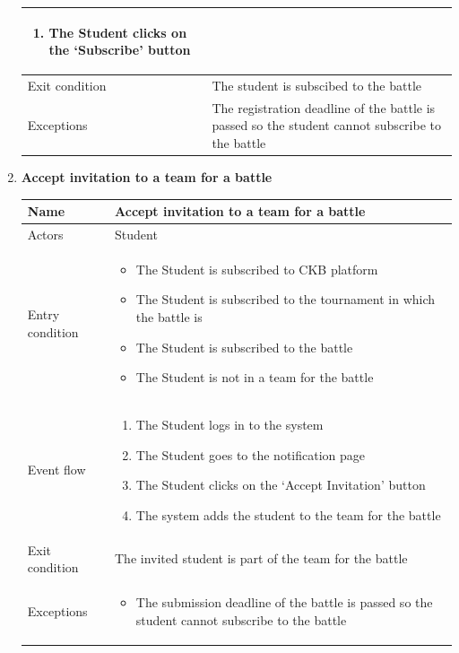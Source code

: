 \begin{enumerate}[label=UC\arabic*:]
\begin{tabular}{|p{3cm}|p{8cm}|}
\begin{enumerate}[label=\arabic*.]
            \item The Student clicks on the `Subscribe' button
        \end{enumerate} \\
        \hline
        Exit condition & The student is subscibed to the battle \\
        \hline
        Exceptions & The registration deadline of the battle is passed so the student cannot subscribe to the battle \\
        \hline
    \end{tabular}
    \item \textbf{Accept invitation to a team for a battle} \\
    \begin{tabular}{|p{3cm}|p{8cm}|}
        \hline
        Name & Accept invitation to a team for a battle \\
        \hline
        Actors & Student \\
        \hline
        Entry condition &
        \begin{itemize}
            \item The Student is subscribed to CKB platform
            \item The Student is subscribed to the tournament in which the battle is
            \item The Student is subscribed to the battle
            \item The Student is not in a team for the battle
        \end{itemize} \\
        \hline
        Event flow &
        \begin{enumerate}[label=\arabic*.]
            \item The Student logs in to the system
            \item The Student goes to the notification page
            \item The Student clicks on the `Accept Invitation' button
            \item The system adds the student to the team for the battle
        \end{enumerate} \\
        \hline
        Exit condition & The invited student is part of the team for the battle \\
        \hline
        Exceptions &
        \begin{itemize}
            \item The submission deadline of the battle is passed so the student cannot subscribe to the battle

\end{itemize}
\end{tabular}
\end{enumerate}
